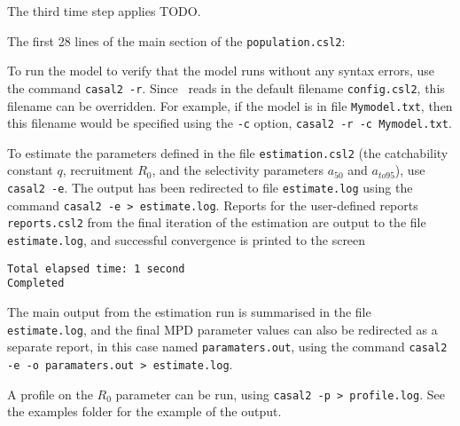 The third time step applies TODO.

The first 28 lines of the main section of the \texttt{population.csl2}:

 

To run the model to verify that the model runs without any syntax errors, use the command \texttt{casal2 -r}. Since \CNAME\ reads in the default filename \texttt{config.csl2}, this filename can be overridden. For example, if the model is in file \texttt{Mymodel.txt}, then this filename would be specified using the \texttt{-c} option, \texttt{casal2 -r -c Mymodel.txt}.

To estimate the parameters defined in the file \texttt{estimation.csl2} (the catchability constant $q$, recruitment $R_0$, and the selectivity parameters $a_{50}$ and $a_{to95}$), use \texttt{casal2 -e}. The output has been redirected to file  \texttt{estimate.log} using the command \texttt{casal2 -e > estimate.log}. Reports for the user-defined reports \texttt{reports.csl2} from the final iteration of the estimation are output to the file \texttt{estimate.log}, and successful convergence is printed to the screen

{\small{\begin{verbatim}
Total elapsed time: 1 second
Completed
\end{verbatim}}}

The main output from the estimation run is summarised in the file \texttt{estimate.log}, and the final MPD parameter values can also be redirected as a separate report, in this case named \texttt{paramaters.out}, using the command \texttt{casal2 -e -o paramaters.out > estimate.log}.

A profile on the $R_0$ parameter can be run, using \texttt{casal2 -p > profile.log}. See the examples folder for the example of the output.

